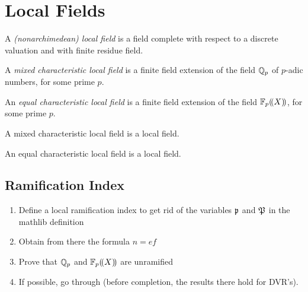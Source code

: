 \section{Local Fields}
\begin{definition}
	\label{def:LocalField}
	\leanok
	A \textit{(nonarchimedean) local field} is a field complete with respect to a discrete
	valuation and with finite residue field.
\end{definition}

\begin{definition}
	\label{def:MixedCharLocalField}
	\leanok
	A \textit{mixed characteristic local field} is a finite field extension of the field 
	$\Qp$ of $p$-adic numbers, for some prime $p$.
\end{definition}

\begin{definition}
	\label{def:EqCharLocalField}
	\leanok
	An \textit{equal characteristic local field} is a finite field extension of the field 
	$\laurentseries$, for some prime $p$.
\end{definition}

\begin{lemma}
	\label{lem:MixedCharLocalField.localField}
	A mixed characteristic local field is a local field.
\end{lemma}

\begin{lemma}
	\label{lem:EqCharLocalField.localField}
	An equal characteristic local field is a local field.
\end{lemma}
\subsection{Ramification Index}
\begin{enumerate}
	\item Define a local ramification index to get rid of the variables $\primeid$ and $\primeid[P]$ in the mathlib definition
	\item Obtain from there the formula $n=ef$
	\item Prove that $\Qp$ and $\laurentseries$ are unramified
	\item If possible, go through \cite[Chap. I, \S6]{Se2} (before completion, the results there hold for DVR's).
\end{enumerate}
